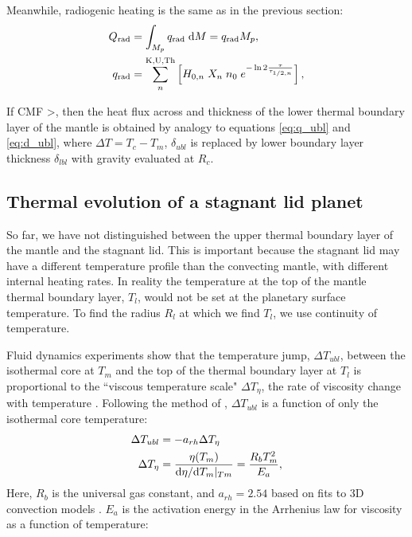 \documentclass[10pt,a4paper]{article}
\begin{document}
Meanwhile, radiogenic heating is the same as in the previous section:
\begin{align}
Q_{\rm rad} &= \int_{M_p} q_{\rm rad} \; {\rm d}M = q_{\rm rad} M_p,\\
q_{\rm rad} &= \sum^{\rm K, U, Th}_n \left[ H_{0, n} \; X_n \; n_0 \; e^{-\ln 2 \frac{\tau}{\tau_{1/2 ,n}}} \right],
\end{align}

If CMF \textgreater {}, then the heat flux across and thickness of the lower thermal boundary layer of the mantle is obtained by analogy to equations \ref{eq:q_ubl} and \ref{eq:d_ubl}, where $\Delta T = T_c - T_m$, $\delta_{ubl}$ is replaced by lower boundary layer thickness $\delta_{lbl}$ with gravity evaluated at $R_c$.


\subsection{Thermal evolution of a stagnant lid planet}

So far, we have not distinguished between the upper thermal boundary layer of the mantle and the stagnant lid. This is important because the stagnant lid may have a different temperature profile than the convecting mantle, with different internal heating rates. In reality the temperature at the top of the mantle thermal boundary layer, $T_l$, would not be set at the planetary surface temperature. To find the radius $R_l$ at which we find $T_l$, we use continuity of temperature.

Fluid dynamics experiments show that the temperature jump, $\Delta T_{ubl}$, between the isothermal core at $T_m$ and the top of the thermal boundary layer at $T_l$ is proportional to the ``viscous temperature scale" $\Delta T_\eta$, the rate of viscosity change with temperature \citep{DavailleJaupart1993}. Following the method of \citet{Thiriet2019}, $\Delta T_{ubl}$ is a function of only the isothermal core temperature:
\begin{align}
\label{eq:Tl}
\Delta T_{ubl} &= -a_{rh} \Delta T_{\eta} \\
\Delta T_{\eta} &= \frac{\eta(T_m)}{{\rm d}\eta/{\rm d}T_m\vert_{Tm}} = \frac{R_b T_m^2}{E_a},
\end{align}
Here, $R_b$ is the universal gas constant, and $a_{rh} = 2.54$ based on fits to 3D convection models \citep{Thiriet2019}. $E_a$ is the activation energy in the Arrhenius law for viscosity as a function of temperature:
\end{document}
